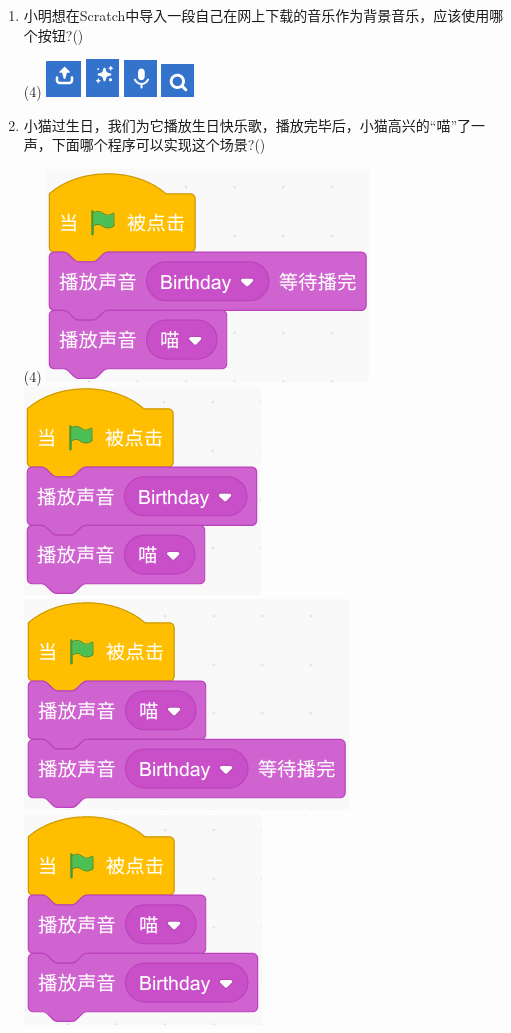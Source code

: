 \documentclass[10pt, a4paper]{article}
\begin{document}
\begin{enumerate}
        \item 小明想在Scratch中导入一段自己在网上下载的音乐作为背景音乐，应该使用哪个按钮?(\qquad)
        \begin{tasks}(4)
            \task \includegraphics[width=.03\textwidth]{11a.png}
            \task \includegraphics[width=.03\textwidth]{11b.png}
            \task \includegraphics[width=.03\textwidth]{11c.png}
            \task \includegraphics[width=.03\textwidth]{11d.png}
        \end{tasks}
        
        \item  小猫过生日，我们为它播放生日快乐歌，播放完毕后，小猫高兴的“喵”了一声，下面哪个程序可以实现这个场景?(\qquad)
        \begin{tasks}(4)
            \task \includegraphics[width=.15\textwidth]{12a.png}
            \task \includegraphics[width=.12\textwidth]{12b.png}
            \task \includegraphics[width=.17\textwidth]{12c.png}
            \task \includegraphics[width=.12\textwidth]{12d.png}
        \end{tasks}


\end{enumerate}
\end{document}
